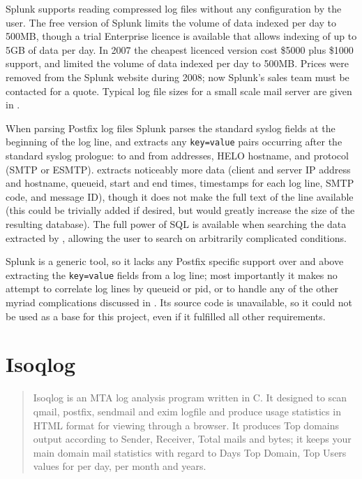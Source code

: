 Splunk supports reading compressed log files without any configuration by
the user.  The free version of Splunk limits the volume of data indexed per
day to 500MB, though a trial Enterprise licence is available that allows
indexing of up to 5GB of data per day.  In 2007 the cheapest licenced
version cost \$5000 plus \$1000 support, and limited the volume of data
indexed per day to 500MB\@.  Prices were removed from the Splunk website
during 2008; now Splunk's sales team must be contacted for a quote.
Typical log file sizes for a small scale mail server are given in
.

When parsing Postfix log files Splunk parses the standard
syslog fields at the beginning of the log line, and extracts
any \texttt{key=value} pairs occurring after the standard syslog prologue:
to and from addresses, HELO hostname, and protocol (\gls{SMTP} or
\gls{ESMTP}).  \parsername{} extracts noticeably more data (client and
server \gls{IP} address and hostname, queueid, start and end times,
timestamps for each log line, \gls{SMTP} code, and message ID), though it
does not make the full text of the line available (this could be trivially
added if desired, but would greatly increase the size of the resulting
database).  The full power of \gls{SQL} is available when searching the
data extracted by \parsername{}, allowing the user to search on arbitrarily
complicated conditions.

Splunk is a generic tool, so it lacks any Postfix specific support over and
above extracting the \texttt{key=value} fields from a log line; most
importantly it makes no attempt to correlate log lines by queueid or
\gls{pid}, or to handle any of the other myriad complications discussed in
.  Its source code is unavailable, so it could
not be used as a base for this project, even if it fulfilled all other
requirements.

\section{Isoqlog}

\begin{quotation}

    Isoqlog is an MTA log analysis program written in C. It designed to
    scan qmail, postfix, sendmail and exim logfile and produce usage
    statistics in HTML format for viewing through a browser. It produces
    Top domains output according to Sender, Receiver, Total mails and
    bytes; it keeps your main domain mail statistics with regard to Days
    Top Domain, Top Users values for per day, per month and years.

\end{quotation}

